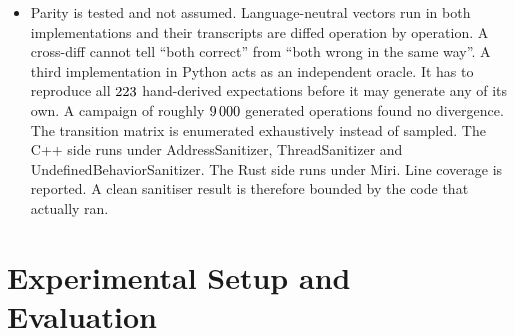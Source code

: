 \documentclass[english,twoside,openright,a4paper,censored,csm,software-track-2020]{HYthesisML}
\begin{document}
\begin{itemize}
        mutex and two condition variables. C++ has no payload-carrying enumeration in this idiom
        either. A request becomes a tagged struct holding every argument field any operation might
        need, $\CppRequestBytes$~bytes against Rust's $\RustRequestBytes$. The caller answers
        through a \texttt{variant} it has to unwrap. The net result is a Rust core
        $\NlocRise\%$ longer in code lines whose total cyclomatic complexity is
        $\CcnTotalDrop\%$ lower~\cite{lizard}. The branchiest function in either core is the C++
        worker loop that dispatches that \texttt{variant}. The Rust library contains no
        \texttt{unsafe} at all.
  \item Parity is tested and not assumed. Language-neutral vectors run in both implementations
        and their transcripts are diffed operation by operation. A cross-diff cannot tell
        ``both correct'' from ``both wrong in the same way''. A third implementation in Python
        acts as an independent oracle. It has to reproduce all $223$ hand-derived
        expectations before it may generate any of its own. A campaign of roughly $9\,000$
        generated operations found no divergence. The transition matrix is enumerated
        exhaustively instead of sampled. The C++ side runs under AddressSanitizer,
        ThreadSanitizer and UndefinedBehaviorSanitizer. The Rust side runs under Miri. Line
        coverage is reported. A clean sanitiser result is therefore bounded by the code that
        actually ran.
\end{itemize}

\chapter{Experimental Setup and Evaluation\label{chapter:eval}}
\end{document}
